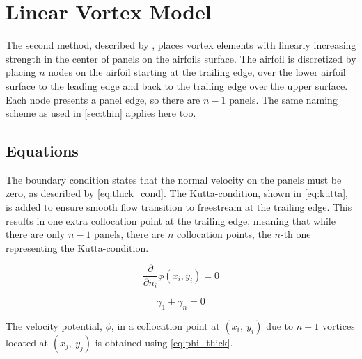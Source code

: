 \section{Linear Vortex Model}
\label{sec:thick}
The second method, described by %
\citeauthor{kuethe_chow_1998}\cite{kuethe_chow_1998}, places vortex elements
with linearly increasing strength in the center of panels on the airfoils
surface. The airfoil is discretized by placing $n$ nodes on the airfoil starting
at the trailing edge, over the lower airfoil surface to the leading edge and
back to the trailing edge over the upper surface. Each node presents a panel
edge, so there are $n-1$ panels. The same naming scheme as used in
\autoref{sec:thin} applies here too.

\subsection{Equations}
\label{ssec:eq_thick}
The boundary condition states that the normal velocity on the panels
must be zero, as described by \autoref{eq:thick_cond}\cite{kuethe_chow_1998}.
The Kutta-condition, shown in \autoref{eq:kutta}, is
added to ensure smooth flow transition to freestream at the trailing edge. This
results in one extra collocation point at the trailing edge, meaning that while
there are only $n-1$ panels, there are $n$ collocation points, the $n$-th one
representing the Kutta-condition.
\smallskip

\begin{minipage}{.5\linewidth}
\begin{equation}
  \label{eq:thick_cond}
  \frac{\partial}{\partial n_{i}} \phi\left(x_{i}, y_{i}\right)=0
  \end{equation}
\end{minipage}
\begin{minipage}{.5\linewidth}
\begin{equation}
  \label{eq:kutta}
      \gamma_1 + \gamma_{n} = 0
\end{equation}
\end{minipage}
\smallskip

The velocity potential, $\phi$, in a collocation point at $(x_i,\: y_i)$ due
to $n-1$ vortices located at $(x_j, \: y_j)$ is obtained using
\autoref{eq:phi_thick}.

